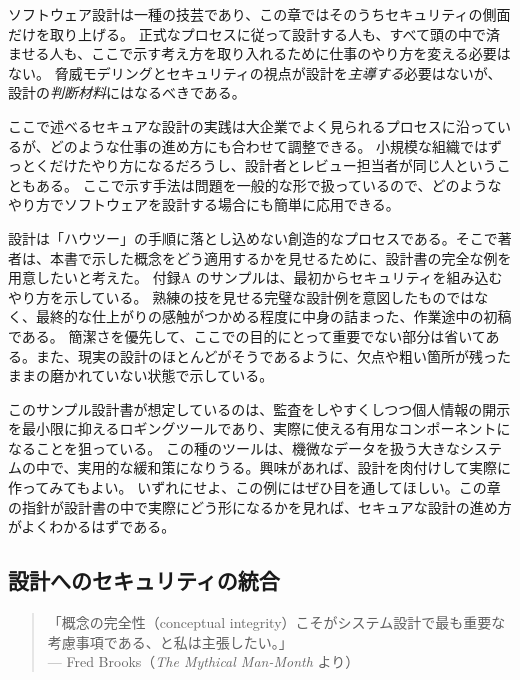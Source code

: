 \documentclass[uplatex]{jsarticle}
\def\label#1{}%
\begin{document}
ソフトウェア設計は一種の技芸であり、この章ではそのうちセキュリティの側面だけを取り上げる。
正式なプロセスに従って設計する人も、すべて頭の中で済ませる人も、ここで示す考え方を取り入れるために仕事のやり方を変える必要はない。
脅威モデリングとセキュリティの視点が設計を\emph{主導する}必要はないが、設計の\emph{判断材料}にはなるべきである。

ここで述べるセキュアな設計の実践は大企業でよく見られるプロセスに沿っているが、どのような仕事の進め方にも合わせて調整できる。
小規模な組織ではずっとくだけたやり方になるだろうし、設計者とレビュー担当者が同じ人ということもある。
ここで示す手法は問題を一般的な形で扱っているので、どのようなやり方でソフトウェアを設計する場合にも簡単に応用できる。

\begin{rem}[セキュリティを統合した設計書のサンプル]\label{rem:ch6-sample-design-document}
設計は「ハウツー」の手順に落とし込めない創造的なプロセスである。そこで著者は、本書で示した概念をどう適用するかを見せるために、設計書の完全な例を用意したいと考えた。
付録A のサンプルは、最初からセキュリティを組み込むやり方を示している。
熟練の技を見せる完璧な設計例を意図したものではなく、最終的な仕上がりの感触がつかめる程度に中身の詰まった、作業途中の初稿である。
簡潔さを優先して、ここでの目的にとって重要でない部分は省いてある。また、現実の設計のほとんどがそうであるように、欠点や粗い箇所が残ったままの磨かれていない状態で示している。

このサンプル設計書が想定しているのは、監査をしやすくしつつ個人情報の開示を最小限に抑えるロギングツールであり、実際に使える有用なコンポーネントになることを狙っている。
この種のツールは、機微なデータを扱う大きなシステムの中で、実用的な緩和策になりうる。興味があれば、設計を肉付けして実際に作ってみてもよい。
いずれにせよ、この例にはぜひ目を通してほしい。この章の指針が設計書の中で実際にどう形になるかを見れば、セキュアな設計の進め方がよくわかるはずである。
\end{rem}

\subsection{設計へのセキュリティの統合}\label{subsec:ch6-integrating-security}

\begin{quote}
「概念の完全性（conceptual integrity）こそがシステム設計で最も重要な考慮事項である、と私は主張したい。」\\
\hfill --- Fred Brooks（\textit{The Mythical Man-Month} より）
\end{quote}
\end{document}
